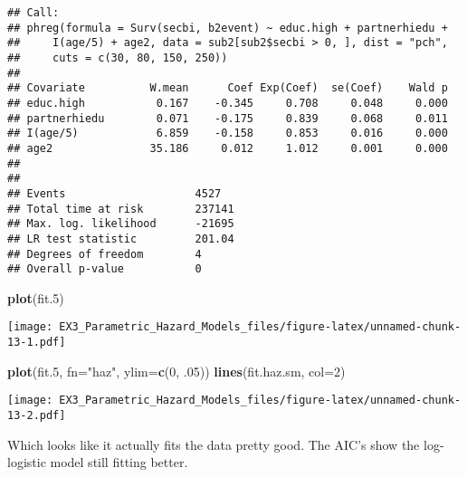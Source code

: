 \documentclass[
]{article}
\newenvironment{Shaded}{\begin{snugshade}}{\end{snugshade}}
\newcommand{\DataTypeTok}[1]{\textcolor[rgb]{0.13,0.29,0.53}{#1}}
\newcommand{\DecValTok}[1]{\textcolor[rgb]{0.00,0.00,0.81}{#1}}
\newcommand{\FloatTok}[1]{\textcolor[rgb]{0.00,0.00,0.81}{#1}}
\newcommand{\KeywordTok}[1]{\textcolor[rgb]{0.13,0.29,0.53}{\textbf{#1}}}
\newcommand{\NormalTok}[1]{#1}
\newcommand{\OperatorTok}[1]{\textcolor[rgb]{0.81,0.36,0.00}{\textbf{#1}}}
\newcommand{\StringTok}[1]{\textcolor[rgb]{0.31,0.60,0.02}{#1}}
\begin{document}
\begin{verbatim}
## Call:
## phreg(formula = Surv(secbi, b2event) ~ educ.high + partnerhiedu + 
##     I(age/5) + age2, data = sub2[sub2$secbi > 0, ], dist = "pch", 
##     cuts = c(30, 80, 150, 250))
## 
## Covariate          W.mean      Coef Exp(Coef)  se(Coef)    Wald p
## educ.high           0.167    -0.345     0.708     0.048     0.000 
## partnerhiedu        0.071    -0.175     0.839     0.068     0.011 
## I(age/5)            6.859    -0.158     0.853     0.016     0.000 
## age2               35.186     0.012     1.012     0.001     0.000 
## 
## 
## Events                    4527 
## Total time at risk        237141 
## Max. log. likelihood      -21695 
## LR test statistic         201.04 
## Degrees of freedom        4 
## Overall p-value           0
\end{verbatim}

\begin{Shaded}
\begin{Highlighting}[]
\KeywordTok{plot}\NormalTok{(fit}\FloatTok{.5}\NormalTok{)}
\end{Highlighting}
\end{Shaded}

\texttt{[image: EX3\_Parametric\_Hazard\_Models\_files/figure-latex/unnamed-chunk-13-1.pdf]}

\begin{Shaded}
\begin{Highlighting}[]
\KeywordTok{plot}\NormalTok{(fit}\FloatTok{.5}\NormalTok{, }\DataTypeTok{fn=}\StringTok{"haz"}\NormalTok{, }\DataTypeTok{ylim=}\KeywordTok{c}\NormalTok{(}\DecValTok{0}\NormalTok{, }\FloatTok{.05}\NormalTok{))}
\KeywordTok{lines}\NormalTok{(fit.haz.sm, }\DataTypeTok{col=}\DecValTok{2}\NormalTok{)}
\end{Highlighting}
\end{Shaded}

\texttt{[image: EX3\_Parametric\_Hazard\_Models\_files/figure-latex/unnamed-chunk-13-2.pdf]}

Which looks like it actually fits the data pretty good. The AIC's show
the log-logistic model still fitting better.

\begin{Shaded}
\end{Shaded}
\end{document}

